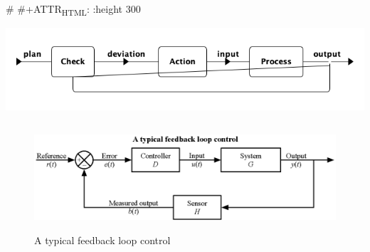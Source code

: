 \documentclass{article}
\begin{document}
\# \#+ATTR\textsubscript{HTML}: :height 300

\begin{center}
\includegraphics[width=.9\linewidth]{Figures/system_feedback_loop.png}
\end{center}






\begin{figure}[htbp]
\centering
\includegraphics[height=150]{./Figures/A_typical_feedback_loop_control.eps}
\caption{\label{fig:orgf2350a4}A typical feedback loop control}
\end{figure}
\end{document}
